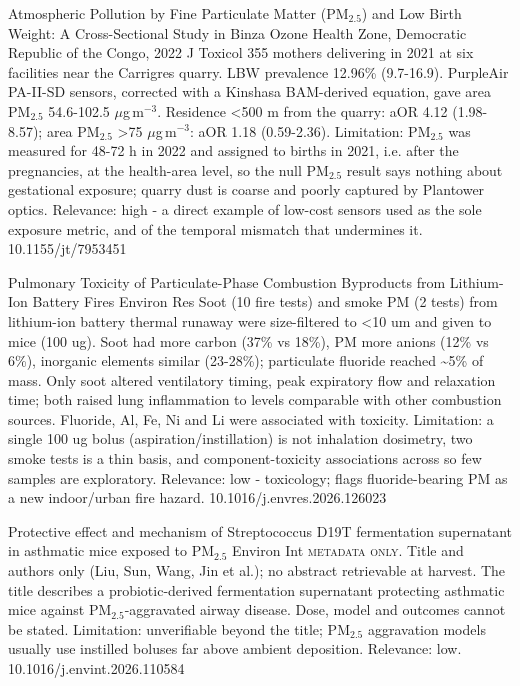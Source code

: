 \documentclass[10pt]{article}
\begin{document}
{Atmospheric Pollution by Fine Particulate Matter (PM$_{2.5}$) and Low Birth Weight: A Cross-Sectional Study in Binza Ozone Health Zone, Democratic Republic of the Congo, 2022}
{J Toxicol}
{355 mothers delivering in 2021 at six facilities near the Carrigres quarry. LBW prevalence 12.96\% (9.7-16.9). PurpleAir PA-II-SD sensors, corrected with a Kinshasa BAM-derived equation, gave area PM$_{2.5}$ 54.6-102.5 $\mu$g\,m$^{-3}$. Residence <500 m from the quarry: aOR 4.12 (1.98-8.57); area PM$_{2.5}$ >75 $\mu$g\,m$^{-3}$: aOR 1.18 (0.59-2.36). Limitation: PM$_{2.5}$ was measured for 48-72 h in 2022 and assigned to births in 2021, i.e. after the pregnancies, at the health-area level, so the null PM$_{2.5}$ result says nothing about gestational exposure; quarry dust is coarse and poorly captured by Plantower optics. Relevance: high - a direct example of low-cost sensors used as the sole exposure metric, and of the temporal mismatch that undermines it.}
{10.1155/jt/7953451}

\par{}\baselineskip{}\baselineskip
{}

{Pulmonary Toxicity of Particulate-Phase Combustion Byproducts from Lithium-Ion Battery Fires}
{Environ Res}
{Soot (10 fire tests) and smoke PM (2 tests) from lithium-ion battery thermal runaway were size-filtered to <10 um and given to mice (100 ug). Soot had more carbon (37\% vs 18\%), PM more anions (12\% vs 6\%), inorganic elements similar (23-28\%); particulate fluoride reached \textasciitilde{}5\% of mass. Only soot altered ventilatory timing, peak expiratory flow and relaxation time; both raised lung inflammation to levels comparable with other combustion sources. Fluoride, Al, Fe, Ni and Li were associated with toxicity. Limitation: a single 100 ug bolus (aspiration/instillation) is not inhalation dosimetry, two smoke tests is a thin basis, and component-toxicity associations across so few samples are exploratory. Relevance: low - toxicology; flags fluoride-bearing PM as a new indoor/urban fire hazard.}
{10.1016/j.envres.2026.126023}

{Protective effect and mechanism of Streptococcus D19T fermentation supernatant in asthmatic mice exposed to PM$_{2.5}$}
{Environ Int}
{\textsc{metadata only.} Title and authors only (Liu, Sun, Wang, Jin et al.); no abstract retrievable at harvest. The title describes a probiotic-derived fermentation supernatant protecting asthmatic mice against PM$_{2.5}$-aggravated airway disease. Dose, model and outcomes cannot be stated. Limitation: unverifiable beyond the title; PM$_{2.5}$ aggravation models usually use instilled boluses far above ambient deposition. Relevance: low.}
{10.1016/j.envint.2026.110584}
\end{document}
